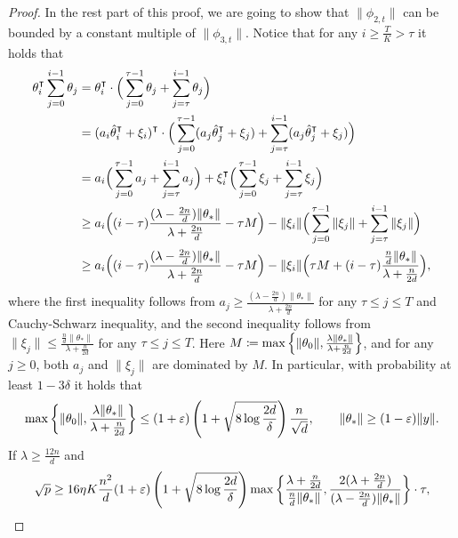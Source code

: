 \begin{proof}
    In the rest part of this proof, we are going to show that $\|\phi_{2,t}\|$ can be bounded by a constant multiple of $\|\phi_{3,t}\|$. Notice that for any $i\geq \frac{T}{K} > \tau$ it holds that 
    \begin{align*}
        \theta_i\transpose\sum_{j=0}^{i-1} \theta_j & = \theta_i\transpose \cdot \Big( \sum_{j=0}^{\tau-1} \theta_j + \sum_{j=\tau}^{i-1} \theta_j \Big) \\
        & = (a_i\hat\theta_i\transpose + \xi_i)\transpose \cdot \Big( \sum_{j=0}^{\tau-1} (a_j\hat\theta_j\transpose + \xi_j) + \sum_{j=\tau}^{i-1} (a_j\hat\theta_j\transpose + \xi_j) \Big) \\
        & = a_i \Big( \sum_{j=0}^{\tau-1} a_j + \sum_{j=\tau}^{i-1} a_j \Big) + \xi_i\transpose \Big( \sum_{j=0}^{\tau-1} \xi_j + \sum_{j=\tau}^{i-1} \xi_j \Big) \\
        & \geq a_i \Big( (i-\tau) \frac{(\lambda-\frac{2n}{d})\|\theta_*\|}{\lambda + \frac{2n}{d}} - \tau M \Big) - \|\xi_i\| \Big( \sum_{j=0}^{\tau-1} \|\xi_j\| + \sum_{j=\tau}^{i-1} \|\xi_j\| \Big) \\
        & \geq a_i \Big( (i-\tau) \frac{(\lambda-\frac{2n}{d})\|\theta_*\|}{\lambda + \frac{2n}{d}} - \tau M \Big) - \|\xi_i\| \Big( \tau M + (i-\tau) \frac{\frac{n}{d}\|\theta_*\|}{\lambda + \frac{n}{2d}} \Big),
    \end{align*}
    where the first inequality follows from $a_j \geq \frac{(\lambda-\frac{2n}{d})\|\theta_*\|}{\lambda + \frac{2n}{d}}$ for any $\tau\leq j\leq T$ and Cauchy-Schwarz inequality, and the second inequality follows from $\|\xi_j\|\leq \frac{\frac{n}{d}\|\theta_*\|}{\lambda + \frac{n}{2d}}$ for any $\tau\leq j\leq T$. Here $M \coloneqq \max\left\{\|\theta_0\|,\frac{\lambda\|\theta_*\|}{\lambda + \frac{n}{2d}}\right\}$, and for any $j\geq 0$, both $a_j$ and $\|\xi_j\|$ are dominated by $M$. In particular, with probability at least $1-3\delta$ it holds that 
    \begin{align*}
        \max\left\{\|\theta_0\|,\frac{\lambda\|\theta_*\|}{\lambda + \frac{n}{2d}}\right\} \leq (1+\varepsilon)\left(1 + \sqrt{8\log\frac{2d}{\delta}}\right)\frac{n}{\sqrt{d}}, \qquad \|\theta_*\| \geq (1-\varepsilon)\|y\|.
    \end{align*}
    If $\lambda\geq \frac{12n}{d}$ and 
    \begin{align*}
        \sqrt{p} \geq 16\eta K\frac{n^2}{d}(1+\eps) \left(1 + \sqrt{8\log\frac{2d}{\delta}}\right) \max\left\{ \frac{\lambda + \frac{n}{2d}}{\frac{n}{d}\|\theta_*\|}, \frac{2(\lambda + \frac{2n}{d})}{(\lambda-\frac{2n}{d})\|\theta_*\|} \right\} \cdot \tau,

\end{align*}
\end{proof}
